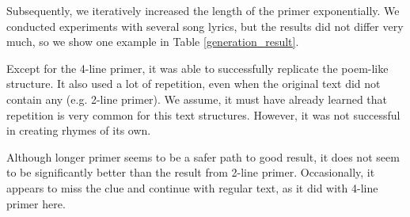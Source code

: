 Subsequently, we iteratively increased the length of the primer exponentially. We conducted experiments with several song lyrics, but the results did not differ very much, so we show one example in Table \ref{generation_result}.

Except for the 4-line primer, it was able to successfully replicate the poem-like structure. It also used a lot of repetition, even when the original text did not contain any (e.g. 2-line primer). We assume, it must have already learned that repetition is very common for this text structures. However, it was not successful in creating rhymes of its own. 

Although longer primer seems to be a safer path to good result, it does not seem to be significantly better than the result from 2-line primer. Occasionally, it appears to miss the clue and continue with regular text, as it did with 4-line primer here.


